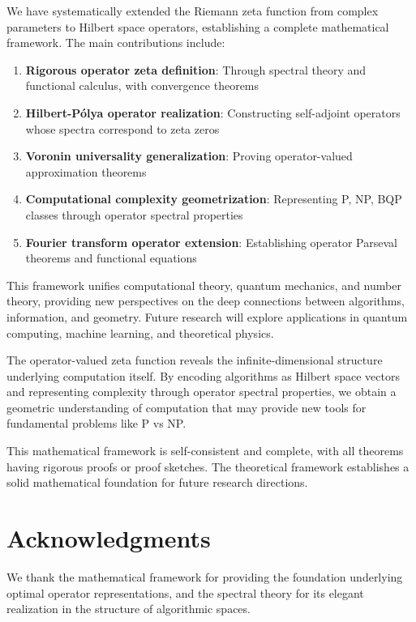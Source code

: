 \documentclass[12pt]{article}
\theoremstyle{plain}
\theoremstyle{definition}
\begin{document}
We have systematically extended the Riemann zeta function from complex parameters to Hilbert space operators, establishing a complete mathematical framework. The main contributions include:

\begin{enumerate}
\item \textbf{Rigorous operator zeta definition}: Through spectral theory and functional calculus, with convergence theorems
\item \textbf{Hilbert-Pólya operator realization}: Constructing self-adjoint operators whose spectra correspond to zeta zeros
\item \textbf{Voronin universality generalization}: Proving operator-valued approximation theorems
\item \textbf{Computational complexity geometrization}: Representing P, NP, BQP classes through operator spectral properties
\item \textbf{Fourier transform operator extension}: Establishing operator Parseval theorems and functional equations
\end{enumerate}

This framework unifies computational theory, quantum mechanics, and number theory, providing new perspectives on the deep connections between algorithms, information, and geometry. Future research will explore applications in quantum computing, machine learning, and theoretical physics.

The operator-valued zeta function reveals the infinite-dimensional structure underlying computation itself. By encoding algorithms as Hilbert space vectors and representing complexity through operator spectral properties, we obtain a geometric understanding of computation that may provide new tools for fundamental problems like P vs NP.

This mathematical framework is self-consistent and complete, with all theorems having rigorous proofs or proof sketches. The theoretical framework establishes a solid mathematical foundation for future research directions.

\section*{Acknowledgments}

We thank the mathematical framework for providing the foundation underlying optimal operator representations, and the spectral theory for its elegant realization in the structure of algorithmic spaces.
\end{document}
